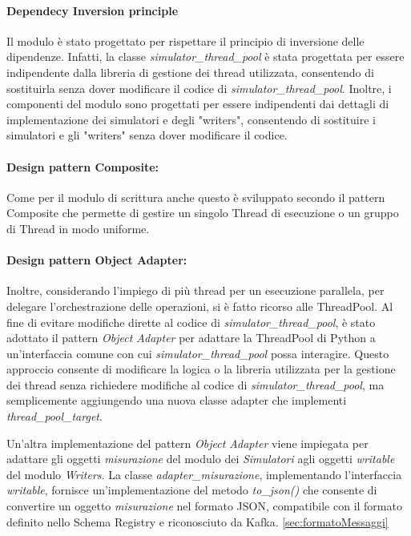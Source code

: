 \paragraph*{Dependecy Inversion principle}
Il modulo è stato progettato per rispettare il principio di inversione delle dipendenze. Infatti, la classe \textit{simulator\_thread\_pool} è stata progettata per essere indipendente dalla libreria di gestione dei thread utilizzata, consentendo di sostituirla senza dover modificare il codice di \textit{simulator\_thread\_pool}.
Inoltre, i componenti del modulo sono progettati per essere indipendenti dai dettagli di implementazione dei simulatori e degli "writers", consentendo di sostituire i simulatori e gli "writers" senza dover modificare il codice.

\paragraph{Design pattern Composite:}
Come per il modulo di scrittura anche questo è sviluppato secondo il pattern Composite che permette di gestire un singolo Thread di esecuzione o un gruppo di Thread in modo uniforme.
\paragraph{Design pattern Object Adapter:}
Inoltre, considerando l'impiego di più thread per un esecuzione parallela, per delegare l'orchestrazione delle operazioni, si è fatto ricorso alle ThreadPool. Al fine di evitare modifiche dirette al codice di \textit{simulator\_thread\_pool}, è stato adottato il pattern \textit{Object Adapter} per adattare la ThreadPool di Python a un'interfaccia comune con cui \textit{simulator\_thread\_pool} possa interagire. Questo approccio consente di modificare la logica o la libreria utilizzata per la gestione dei thread senza richiedere modifiche al codice di \textit{simulator\_thread\_pool}, ma semplicemente aggiungendo una nuova classe adapter che implementi \textit{thread\_pool\_target}.

Un'altra implementazione del pattern \textit{Object Adapter} viene impiegata per adattare gli oggetti \textit{misurazione} del modulo dei \textit{Simulatori} agli oggetti \textit{writable} del modulo \textit{Writers}. La classe \textit{adapter\_misurazione}, implementando l'interfaccia \textit{writable}, fornisce un'implementazione del metodo \textit{to\_json()} che consente di convertire un oggetto \textit{misurazione} nel formato JSON, compatibile con il formato definito nello Schema Registry e riconosciuto da Kafka.
\ref*{sec:formatoMessaggi}


